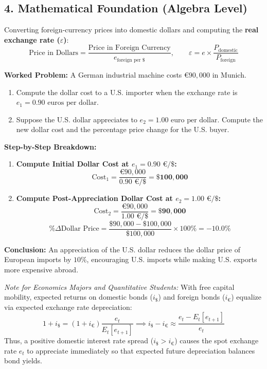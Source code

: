 \documentclass[11pt,letterpaper]{article}
\begin{document}
\subsection*{4. Mathematical Foundation (Algebra Level)}
Converting foreign-currency prices into domestic dollars and computing the \textbf{real exchange rate ($\varepsilon$)}:
\begin{equation}
\text{Price in Dollars} = \frac{\text{Price in Foreign Currency}}{e_{\text{foreign per \$}}}, \qquad \varepsilon = e \times \frac{P_{\text{domestic}}}{P_{\text{foreign}}}
\end{equation}

\noindent\textbf{Worked Problem:}
A German industrial machine costs $€90{,}000$ in Munich.
\begin{enumerate}
    \item Compute the dollar cost to a U.S. importer when the exchange rate is $e_1 = 0.90\text{ euros per dollar}$.
    \item Suppose the U.S. dollar appreciates to $e_2 = 1.00\text{ euro per dollar}$. Compute the new dollar cost and the percentage price change for the U.S. buyer.
\end{enumerate}

\noindent\textbf{Step-by-Step Breakdown:}
\begin{enumerate}
    \item \textbf{Compute Initial Dollar Cost at $e_1 = 0.90\text{ €/\$}$:}
    \[
    \text{Cost}_1 = \frac{€90{,}000}{0.90\text{ €/\$}} = \mathbf{\$100{,}000}
    \]

    \item \textbf{Compute Post-Appreciation Dollar Cost at $e_2 = 1.00\text{ €/\$}$:}
    \[
    \text{Cost}_2 = \frac{€90{,}000}{1.00\text{ €/\$}} = \mathbf{\$90{,}000}
    \]
    \[
    \%\Delta \text{Dollar Price} = \frac{\$90{,}000 - \$100{,}000}{\$100{,}000} \times 100\% = \mathbf{-10.0\%}
    \]
\end{enumerate}
\textbf{Conclusion:} An appreciation of the U.S. dollar reduces the dollar price of European imports by $10\%$, encouraging U.S. imports while making U.S. exports more expensive abroad.

\begin{tcolorbox}[colback=blue!5!white,colframe=blue!75!black,title=\textbf{Optional Advanced Section: Uncovered Interest Rate Parity (UIP)}]
\small
\emph{Note for Economics Majors and Quantitative Students:}
With free capital mobility, expected returns on domestic bonds ($i_{\$}$) and foreign bonds ($i_{€}$) equalize via expected exchange rate depreciation:
\[
1 + i_{\$} = (1 + i_{€}) \frac{e_t}{E_t[e_{t+1}]} \implies i_{\$} - i_{€} \approx \frac{e_t - E_t[e_{t+1}]}{e_t}
\]
Thus, a positive domestic interest rate spread ($i_{\$} > i_{€}$) causes the spot exchange rate $e_t$ to appreciate immediately so that expected future depreciation balances bond yields.
\end{tcolorbox}
\end{document}

